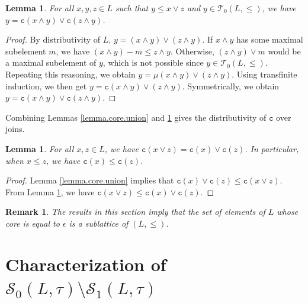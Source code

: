 \documentclass{article}
\newtheorem{lemma}[theorem]{Lemma}
\newtheorem{remark}[theorem]{Remark}
\begin{document}
\begin{lemma}\label{lemma.core.decomposition}
    For all $x,y,z \in L$ such that  $y \le x \vee z$ and $y \in \mathcal{T}_0(L,\le)$, we have $y = \texttt{c}(x \wedge y) \vee \texttt{c}(z \wedge y)$.
\end{lemma}
\begin{proof}
    By distributivity of $L$, $y = (x \wedge y) \vee (z \wedge y)$. If $x \wedge y$ has some maximal subelement $m$, we have $(x \wedge y) - m \le z \wedge y$. Otherwise, $(z \wedge y) \vee m$ would be a maximal subelement of $y$, which is not possible since $y \in \mathcal{T}_0(L,\le)$. Repeating this reasoning, we obtain $y = \mu(x \wedge y) \vee (z \wedge y)$. Using transfinite induction, we then get 
    $y = \texttt{c}(x \wedge y) \vee (z \wedge y)$. Symmetrically, we obtain $y = \texttt{c}(x \wedge y) \vee \texttt{c}(z \wedge y)$.
\end{proof}

{
Combining Lemmas \ref{lemma.core.union} and \ref{lemma.core.decomposition} gives the distributivity of \(\texttt{c}\) over joins.}

\begin{lemma}\label{lemma.lattice.op}
    For all $x, z \in L$, we have $\texttt{c}(x \vee z) = \texttt{c}(x) \vee \texttt{c}(z)$. In particular, when $x \le z$, we have $\texttt{c}(x) \le \texttt{c}(z)$.
\end{lemma}

\begin{proof}
    Lemma \ref{lemma.core.union} implies that $\texttt{c}(x) \vee \texttt{c}(z) \le \texttt{c}(x \vee z)$. From Lemma \ref{lemma.core.decomposition}, we have $\texttt{c}(x \vee z) \le \texttt{c}(x) \vee \texttt{c}(z)$.
\end{proof}


\begin{remark}
    The results in this section imply that the set of elements of $L$ whose core is equal to $\epsilon$ is a sublattice of $(L,\le)$. 
\end{remark}

%
%
%

\section{\label{section.lattice.proofs.1}Characterization of $\mathcal{S}_0(L,\tau) \setminus \mathcal{S}_1(L,\tau)$}
\end{document}

